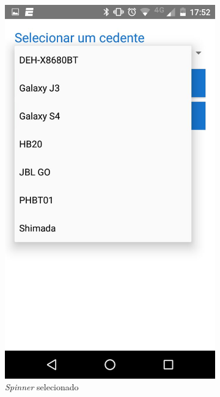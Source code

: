 \documentclass[hidelinks,12pt]{article}
\begin{document}
\begin{figure}[H]
	\begin{subfigure}{0.5\textwidth}
		\includegraphics[scale=0.3]{spinner_on} 
		\caption{\textit{Spinner} selecionado}
		\label{spinner_on}
	\end{subfigure}
	\begin{subfigure}{0.5\textwidth}

\end{subfigure}
\end{figure}
\end{document}
